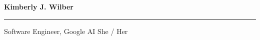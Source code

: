 \documentclass[10pt,letterpaper]{article}
\begin{document}
\thispagestyle{plain}
\begin{minipage}{0.60\textwidth}
  \flushleft
{\bfseries\Huge Kimberly J. Wilber}
\vspace{-0.8em}
\rule[0.7em]{\linewidth}{0.5mm}
Software Engineer, Google AI
\hfill {She / Her}
\end{minipage}
\hfill
\begin{minipage}[ht]{0.38\textwidth}
\end{minipage}
\end{document}
